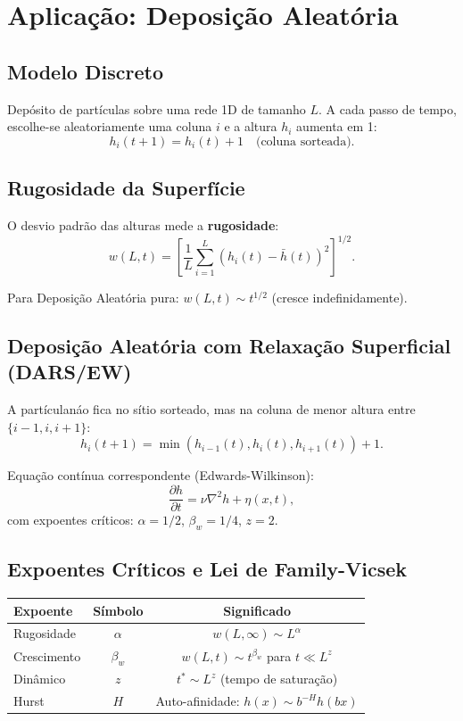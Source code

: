 \documentclass[12pt,a4paper]{article}
\begin{document}
\section{Aplica\c{c}\~ao: Deposi\c{c}\~ao Aleat\'oria}

\subsection{Modelo Discreto}

Dep\'osito de part\'iculas sobre uma rede 1D de tamanho $L$. A cada passo de tempo, escolhe-se aleatoriamente uma coluna $i$ e a altura $h_i$ aumenta em 1:
\[
  h_i(t+1) = h_i(t) + 1 \quad \text{(coluna sorteada)}.
\]

\subsection{Rugosidade da Superf\'icie}

O desvio padr\~ao das alturas mede a \textbf{rugosidade}:
\[
  w(L, t) = \left[\frac{1}{L}\sum_{i=1}^{L}(h_i(t) - \bar{h}(t))^2\right]^{1/2}.
\]

Para Deposi\c{c}\~ao Aleat\'oria pura: $w(L,t) \sim t^{1/2}$ (cresce indefinidamente).

\subsection{Deposi\c{c}\~ao Aleat\'oria com Relaxa\c{c}\~ao Superficial (DARS/EW)}

A part\'iculan\'ao fica no s\'itio sorteado, mas na coluna de menor altura entre $\{i-1, i, i+1\}$:
\[
  h_i(t+1) = \min(h_{i-1}(t), h_i(t), h_{i+1}(t)) + 1.
\]

Equa\c{c}\~ao cont\'inua correspondente (Edwards-Wilkinson):
\[
  \frac{\partial h}{\partial t} = \nu \nabla^2 h + \eta(x,t),
\]
com expoentes cr\'iticos: $\alpha = 1/2$, $\beta_w = 1/4$, $z = 2$.

\subsection{Expoentes Cr\'iticos e Lei de Family-Vicsek}

\begin{center}
\begin{tabular}{lcc}
\toprule
Expoente & S\'imbolo & Significado \\
\midrule
Rugosidade & $\alpha$ & $w(L, \infty) \sim L^\alpha$ \\
Crescimento & $\beta_w$ & $w(L, t) \sim t^{\beta_w}$ para $t \ll L^z$ \\
Din\^amico & $z$ & $t^* \sim L^z$ (tempo de satura\c{c}\~ao) \\
Hurst & $H$ & Auto-afinidade: $h(x) \sim b^{-H} h(bx)$ \\
\bottomrule
\end{tabular}
\end{center}
\end{document}
